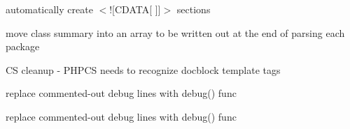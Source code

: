 \begin{DoxyRefList}
automatically create $<$!\mbox{[}\-C\-D\-A\-T\-A\mbox{[} \mbox{]}\mbox{]}$>$ sections  
\item[\label{todo__todo000020}%
\hypertarget{todo__todo000020}{}%
\-Global \hyperlink{class_x_m_l_doc_bookpeardoc2_converter_ae4962a5674fd1be0f3795cb72f2974bf}{\-X\-M\-L\-Doc\-Bookpeardoc2\-Converter} ()]move class summary into an array to be written out at the end of parsing each package  
\item[\label{todo__todo000173}%
\hypertarget{todo__todo000173}{}%
\-Global \hyperlink{class_x_m_l_package_page_parser_a4d5d6de1bd28d678fdca6e4d5e0076b0}{\-X\-M\-L\-Package\-Page\-Parser} (\$word, \$pevent)]\-C\-S cleanup -\/ \-P\-H\-P\-C\-S needs to recognize docblock template tags  
\item[\label{todo__todo000175}%
\hypertarget{todo__todo000175}{}%
\-Global \hyperlink{class_x_m_l_package_page_parser_a3c0943f8844d0d531ffff0fb43c36bd4}{\-X\-M\-L\-Package\-Page\-Parser} (\$word, \$pevent)]replace commented-\/out debug lines with debug() func  
\item[\label{todo__todo000174}%
\hypertarget{todo__todo000174}{}%
\-Global \hyperlink{class_x_m_l_package_page_parser_a04c9d956763b0f5c797a3c75f6aee07b}{\-X\-M\-L\-Package\-Page\-Parser} (\$word, \$pevent)]replace commented-\/out debug lines with debug() func 
\end{DoxyRefList}